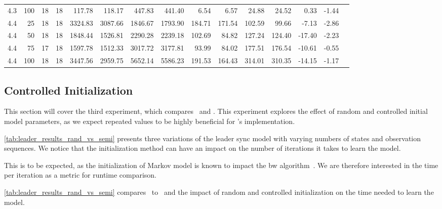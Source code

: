 \begin{table*}
\begin{tabular}{rrrrrrrrrrrrrrr}
        4.3           & 100 & 18      & 18      & 117.78      & 118.17      & 447.83     & 441.40     & 6.54          & 6.57          & 24.88        & 24.52        & 0.33         & -1.44       \\
        4.4           & 25  & 18      & 18      & 3324.83     & 3087.66     & 1846.67    & 1793.90    & 184.71        & 171.54        & 102.59       & 99.66        & -7.13        & -2.86       \\
        4.4           & 50  & 18      & 18      & 1848.44     & 1526.81     & 2290.28    & 2239.18    & 102.69        & 84.82         & 127.24       & 124.40       & -17.40       & -2.23       \\
        4.4           & 75  & 17      & 18      & 1597.78     & 1512.33     & 3017.72    & 3177.81    & 93.99         & 84.02         & 177.51       & 176.54       & -10.61       & -0.55       \\
        4.4           & 100 & 18      & 18      & 3447.56     & 2959.75     & 5652.14    & 5586.23    & 191.53        & 164.43        & 314.01       & 310.35       & -14.15       & -1.17       \\
        \bottomrule
    \end{tabular}
\end{table*}


\subsection{Controlled Initialization}\label{subsec:controled_initialization}
This section will cover the third experiment, which compares \Cupaal\ and \Jajapy.
This experiment explores the effect of random and controlled initial model parameters, as we expect repeated values to be highly beneficial for \Cupaal’s implementation.

\autoref{tab:leader_results_rand_vs_semi} presents three variations of the leader sync model with varying numbers of states and observation sequences.
We notice that the initialization method can have an impact on the number of iterations it takes to learn the model.

This is to be expected, as the initialization of Markov model is known to impact the \gls{bw} algorithm~\cite{Rabiner89}.
We are therefore interested in the time per iteration as a metric for runtime comparison.

\autoref{tab:leader_results_rand_vs_semi} compares \Cupaal\ to \Jajapy\ and the impact of random and controlled initialization on the time needed to learn the model.

